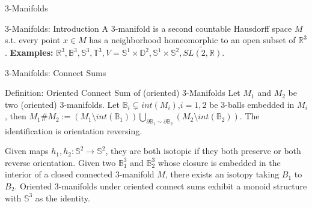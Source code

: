 \documentclass{beamer}
\begin{document}
\begin{section}{3-Manifolds} 

\begin{frame}{3-Manifolds: Introduction}
    A 3-manifold is a second countable Hausdorff space $M$ s.t. every point $x\in M$ has a neighborhood homeomorphic to an open subset of $\mathbb{R}^3$.
    \newline
    \newline
    \textbf{Examples:} $\mathbb{R}^3, \mathbb{B}^3, \mathbb{S}^3,\mathbb{T}^3,V=\mathbb{S}^1\times \mathbb{D}^2, \mathbb{S}^1\times \mathbb{S}^2, \widetilde{SL(2,\mathbb{R})}$.
    
    
\end{frame}

\begin{frame}{3-Manifolds: Connect Sums}
    \begin{block}{Definition: Oriented Connect Sum of (oriented) 3-Manifolds}
        Let $M_1$ and $M_2$ be two (oriented) 3-manifolds. Let $\mathbb{B}_i\subsetneq int(M_i)$,$i=1,2$ be 3-balls embedded in $M_i$, then $M_1\#M_2 := (M_1\setminus int(\mathbb{B}_1))\bigcup_{\partial \mathbb{B}_1 \sim \partial \mathbb{B}_2} (M_2 \setminus int(\mathbb{B}_2))$. The identification is orientation reversing.  
    \end{block}
    \newline
    \newline
    Given maps $h_1,h_2:\mathbb{S}^2 \rightarrow \mathbb{S}^2$, they are both isotopic if they both preserve or both reverse orientation.
    \newline
    \newline
    Given two $\mathbb{B}^3_1$ and $\mathbb{B}^3_2$ whose closure is embedded in the interior of a closed connected 3-manifold $M$, there exists an isotopy taking $B_1$ to $B_2$.  
    \newline
    \newline
    Oriented 3-manifolds under oriented connect sums exhibit a monoid structure with $\mathbb{S}^3$ as the identity.
    \newline
    \newline
\end{frame}


\end{section}
\end{document}
